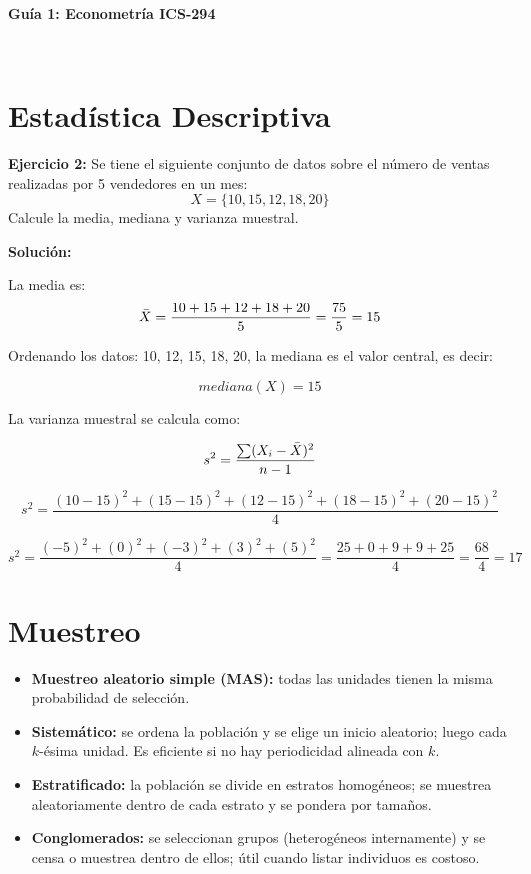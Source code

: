 \documentclass[10pt,a4paper]{article}
\begin{document}
\vspace{5cm}

\begin{center}
\begin{Large}
\textbf{\\Guía 1: Econometría ICS-294}
\end{Large}\\
\end{center}


\section{Estadística Descriptiva}

\textbf{Ejercicio 2:} Se tiene el siguiente conjunto de datos sobre el número de ventas realizadas por 5 vendedores en un mes:
$$X = \{10,15,12,18,20\}$$
Calcule la media, mediana y varianza muestral.

{\color{red} \textbf{Solución:}

La media es:
$$\Bar{X} = \frac{10+15+12+18+20}{5} = \frac{75}{5} = 15$$

Ordenando los datos: {10, 12, 15, 18, 20}, la mediana es el valor central, es decir:

$$mediana(X) = 15$$

La varianza muestral se calcula como:

$$s^2 = \frac{\sum (X_i - \Bar{X})^2}{n-1}$$

$$s^2 = \frac{(10-15)^2 + (15-15)^2 + (12 - 15)^2 + (18-15)^2 + (20-15)^2}{4}$$

$$s^2 = \frac{(-5)^2+(0)^2 + (-3)^2 +(3)^2 + (5)^2}{4} = \frac{25+0+9+9+25}{4} = \frac{68}{4} = 17$$}








\section{Muestreo}

\begin{itemize}
  \item \textbf{Muestreo aleatorio simple (MAS):} todas las unidades tienen la misma probabilidad de selección.
    \item \textbf{Sistemático:} se ordena la población y se elige un inicio aleatorio; luego cada $k$-ésima unidad. Es eficiente si no hay periodicidad alineada con $k$.
  \item \textbf{Estratificado:} la población se divide en estratos homogéneos; se muestrea aleatoriamente dentro de cada estrato y se pondera por tamaños.
  \item \textbf{Conglomerados:} se seleccionan grupos (heterogéneos internamente) y se censa o muestrea dentro de ellos; útil cuando listar individuos es costoso.
\end{itemize}
\end{document}
